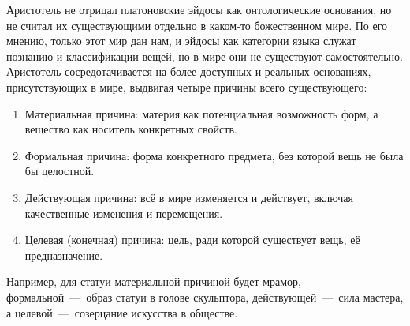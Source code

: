 Аристотель не отрицал платоновские эйдосы как онтологические основания, но не считал их существующими отдельно в каком-то божественном мире. По его мнению, только этот мир дан нам, и эйдосы как категории языка служат познанию и классификации вещей, но в мире они не существуют самостоятельно. Аристотель сосредотачивается на более доступных и реальных основаниях, присутствующих в мире, выдвигая четыре причины всего существующего:
\begin{enumerate}
    \item Материальная причина: материя как потенциальная возможность форм, а вещество как носитель конкретных свойств.
    \item Формальная причина: форма конкретного предмета, без которой вещь не была бы целостной.
    \item Действующая причина: всё в мире изменяется и действует, включая качественные изменения и перемещения.
    \item Целевая (конечная) причина: цель, ради которой существует вещь, её предназначение.
\end{enumerate}

Например, для статуи материальной причиной будет мрамор, формальной~---~образ статуи в голове скульптора, действующей~---~сила мастера, а целевой~---~созерцание искусства в обществе.

